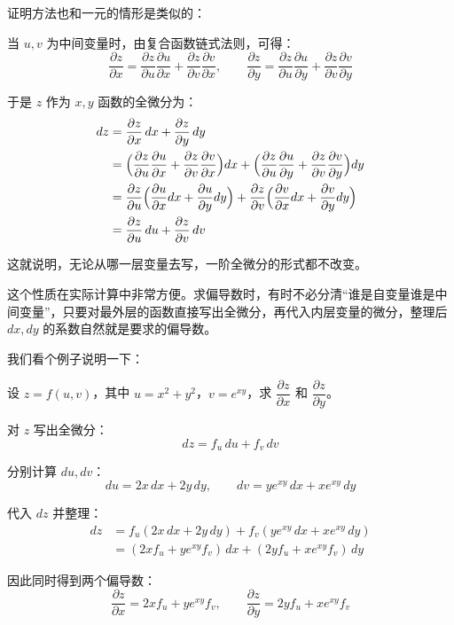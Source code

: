 证明方法也和一元的情形是类似的：

当 $u, v$ 为中间变量时，由复合函数链式法则，可得：
\[
\frac{\partial z}{\partial x} = \frac{\partial z}{\partial u}\frac{\partial u}{\partial x} + \frac{\partial z}{\partial v}\frac{\partial v}{\partial x},\qquad
\frac{\partial z}{\partial y} = \frac{\partial z}{\partial u}\frac{\partial u}{\partial y} + \frac{\partial z}{\partial v}\frac{\partial v}{\partial y}
\]

于是 $z$ 作为 $x, y$ 函数的全微分为：
\begin{align*}
dz &= \frac{\partial z}{\partial x}\,dx + \frac{\partial z}{\partial y}\,dy \\
&= \Bigl(\frac{\partial z}{\partial u}\frac{\partial u}{\partial x} + \frac{\partial z}{\partial v}\frac{\partial v}{\partial x}\Bigr)dx
   + \Bigl(\frac{\partial z}{\partial u}\frac{\partial u}{\partial y} + \frac{\partial z}{\partial v}\frac{\partial v}{\partial y}\Bigr)dy \\
&= \frac{\partial z}{\partial u}\Bigl(\frac{\partial u}{\partial x}dx + \frac{\partial u}{\partial y}dy\Bigr)
   + \frac{\partial z}{\partial v}\Bigl(\frac{\partial v}{\partial x}dx + \frac{\partial v}{\partial y}dy\Bigr) \\
&= \frac{\partial z}{\partial u}\,du + \frac{\partial z}{\partial v}\,dv
\end{align*}

这就说明，无论从哪一层变量去写，一阶全微分的形式都不改变。

这个性质在实际计算中非常方便。求偏导数时，有时不必分清“谁是自变量谁是中间变量”，只要对最外层的函数直接写出全微分，再代入内层变量的微分，整理后 $dx, dy$ 的系数自然就是要求的偏导数。

我们看个例子说明一下：

\begin{myexample}
设 $z = f(u, v)$，其中 $u = x^2 + y^2$，$v = e^{xy}$，求 $\dfrac{\partial z}{\partial x}$ 和 $\dfrac{\partial z}{\partial y}$。

对 $z$ 写出全微分：
\[
dz = f_u\,du + f_v\,dv
\]

分别计算 $du, dv$：
\[
du = 2x\,dx + 2y\,dy,\qquad
dv = y e^{xy}\,dx + x e^{xy}\,dy
\]

代入 $dz$ 并整理：
\begin{align*}
dz &= f_u(2x\,dx + 2y\,dy) + f_v(y e^{xy}\,dx + x e^{xy}\,dy) \\
&= (2x f_u + y e^{xy} f_v)\,dx + (2y f_u + x e^{xy} f_v)\,dy
\end{align*}

因此同时得到两个偏导数：
\[
\frac{\partial z}{\partial x} = 2x f_u + y e^{xy} f_v,\qquad
\frac{\partial z}{\partial y} = 2y f_u + x e^{xy} f_v
\]
\end{myexample}

